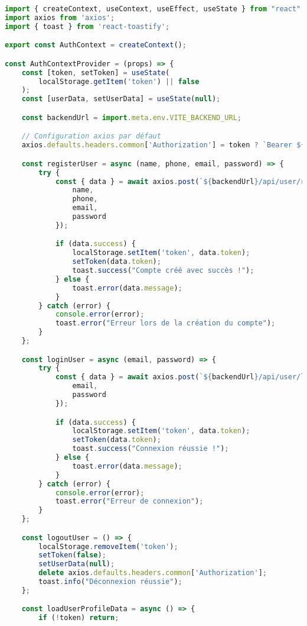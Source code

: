 \begin{lstlisting}[language=JavaScript, caption=AuthContext.jsx]
import { createContext, useContext, useEffect, useState } from "react";
import axios from 'axios';
import { toast } from 'react-toastify';

export const AuthContext = createContext();

const AuthContextProvider = (props) => {
    const [token, setToken] = useState(
        localStorage.getItem('token') || false
    );
    const [userData, setUserData] = useState(null);

    const backendUrl = import.meta.env.VITE_BACKEND_URL;

    // Configuration axios par défaut
    axios.defaults.headers.common['Authorization'] = token ? `Bearer ${token}` : '';

    const registerUser = async (name, phone, email, password) => {
        try {
            const { data } = await axios.post(`${backendUrl}/api/user/register`, {
                name,
                phone,
                email,
                password
            });

            if (data.success) {
                localStorage.setItem('token', data.token);
                setToken(data.token);
                toast.success("Compte créé avec succès !");
            } else {
                toast.error(data.message);
            }
        } catch (error) {
            console.error(error);
            toast.error("Erreur lors de la création du compte");
        }
    };

    const loginUser = async (email, password) => {
        try {
            const { data } = await axios.post(`${backendUrl}/api/user/login`, {
                email,
                password
            });

            if (data.success) {
                localStorage.setItem('token', data.token);
                setToken(data.token);
                toast.success("Connexion réussie !");
            } else {
                toast.error(data.message);
            }
        } catch (error) {
            console.error(error);
            toast.error("Erreur de connexion");
        }
    };

    const logoutUser = () => {
        localStorage.removeItem('token');
        setToken(false);
        setUserData(null);
        delete axios.defaults.headers.common['Authorization'];
        toast.info("Déconnexion réussie");
    };

    const loadUserProfileData = async () => {
        if (!token) return;


\end{lstlisting}
